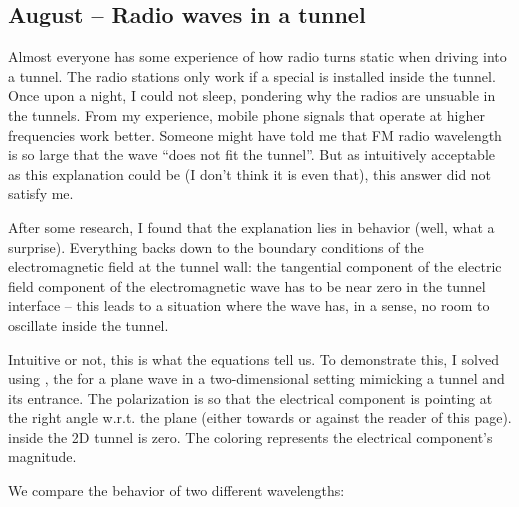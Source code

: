 \documentclass{article}
\begin{document}
\subsection{August – Radio waves in a tunnel}

Almost everyone has some experience of how radio turns static when driving into a tunnel. The radio stations only work if a special   is installed inside the tunnel. Once upon a night, I could not sleep, pondering why the  radios are unsuable in the tunnels. From my experience, mobile phone signals that operate at higher frequencies work better. Someone might have told me that FM radio wavelength is so large that the wave ``does not fit the tunnel''. But as intuitively acceptable as this explanation could be (I don't think it is even that), this answer did not satisfy me.


After some research, I found that the explanation lies in  behavior (well, what a surprise). Everything backs down to the boundary conditions of the electromagnetic field at the tunnel wall: the tangential component of the electric field component of the electromagnetic wave has to be near zero in the tunnel interface – this leads to a situation where the wave has, in a sense, no room to oscillate inside the tunnel.


Intuitive or not, this is what the equations tell us. To demonstrate this, I solved using , the  for a plane wave in a two-dimensional setting mimicking a tunnel and its entrance. The  polarization is so that the electrical component is pointing at the right angle w.r.t. the plane (either towards or against the reader of this page).  inside the 2D tunnel is zero. The coloring represents the electrical component's magnitude.

We compare the behavior of two different wavelengths:
\end{document}
